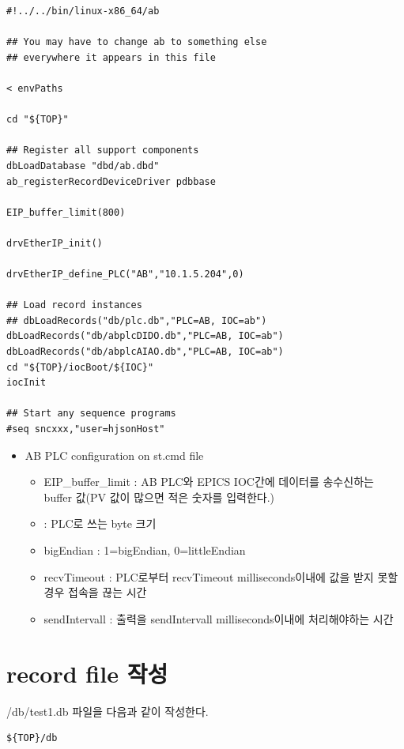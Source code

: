 \documentclass[11pt
  , a4paper
  , article
  , oneside
]{memoir}
\begin{document}
\begin{lstlisting}[style=termstyle]
#!../../bin/linux-x86_64/ab

## You may have to change ab to something else
## everywhere it appears in this file

< envPaths

cd "${TOP}"

## Register all support components
dbLoadDatabase "dbd/ab.dbd"
ab_registerRecordDeviceDriver pdbbase

EIP_buffer_limit(800)

drvEtherIP_init()

drvEtherIP_define_PLC("AB","10.1.5.204",0)

## Load record instances
## dbLoadRecords("db/plc.db","PLC=AB, IOC=ab")
dbLoadRecords("db/abplcDIDO.db","PLC=AB, IOC=ab")
dbLoadRecords("db/abplcAIAO.db","PLC=AB, IOC=ab")
cd "${TOP}/iocBoot/${IOC}"
iocInit

## Start any sequence programs
#seq sncxxx,"user=hjsonHost"

\end{lstlisting}
\begin{itemize}
\item AB PLC configuration on st.cmd file
\begin{itemize}
\item EIP\_buffer\_limit	: AB PLC와 EPICS IOC간에 데이터를 송수신하는 buffer 값(PV 값이 많으면 적은 숫자를 입력한다.)\
\item      : PLC로 쓰는 byte 크기
\item bigEndian     : 1=bigEndian, 0=littleEndian
\item recvTimeout   : PLC로부터 recvTimeout milliseconds이내에 값을 받지 못할 경우 접속을 끊는 시간
\item sendIntervall : 출력을 sendIntervall milliseconds이내에 처리해야하는 시간
\end{itemize}
\end{itemize}

\section{record file 작성}
/db/test1.db 파일을 다음과 같이 작성한다.
 
 
\begin{lstlisting}[style=termstyle]
 ${TOP}/db
\end{lstlisting}
\end{document}
